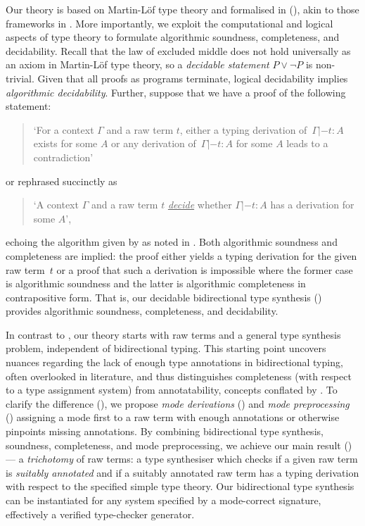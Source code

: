Our theory is based on Martin-L\"of type theory and formalised in \Agda (), akin to those frameworks in .
More importantly, we exploit the computational and logical aspects of type theory to formulate algorithmic soundness, completeness, and decidability. 
Recall that the law of excluded middle does not hold universally as an axiom in Martin-L\"of type theory, so a \emph{decidable statement} $P \vee \neg P$ is non-trivial.
Given that all proofs as programs terminate, logical decidability implies \emph{algorithmic decidability}.
Further, suppose that we have a proof of the following statement:
\begin{quote}
  `For a context $\Gamma$ and a raw term $t$, either a typing derivation of\, $\Gamma |- t : A$ exists for some $A$ or any derivation of\, $\Gamma |- t : A$ for some $A$ leads to a contradiction'
\end{quote}
or rephrased succinctly as 
\begin{quote}
  `A context $\Gamma$ and a raw term $t$ \underline{\emph{decide}} whether $\Gamma |- t : A$ has a derivation for some $A$',
\end{quote}
echoing the algorithm given by \citeauthor{Wadler2022} as noted in .
Both algorithmic soundness and completeness are implied:
the proof either yields a typing derivation for the given raw term~$t$ or a proof that such a derivation is impossible where the former case is algorithmic soundness and the latter is algorithmic completeness in contrapositive form.
That is, our decidable bidirectional type synthesis () provides algorithmic soundness, completeness, and decidability. 

In contrast to \citeauthor{Wadler2022}, our theory starts with raw terms and a general type synthesis problem, independent of bidirectional typing.
This starting point uncovers nuances regarding the lack of enough type annotations in bidirectional typing, often overlooked in literature, and thus distinguishes completeness (with respect to a type assignment system) from annotatability, concepts conflated by \citet{Dunfield2021}. 
To clarify the difference (), we propose \emph{mode derivations} () and \emph{mode preprocessing} () assigning a mode first to a raw term with enough annotations or otherwise pinpoints missing annotations.
By combining bidirectional type synthesis, soundness, completeness, and mode preprocessing, we achieve our main result () --- a \emph{trichotomy} of raw terms: a type synthesiser which checks if a given raw term is \emph{suitably annotated} and if a suitably annotated raw term has a typing derivation with respect to the specified simple type theory.
Our bidirectional type synthesis can be instantiated for any system specified by a mode-correct signature, effectively a verified type-checker generator. 


